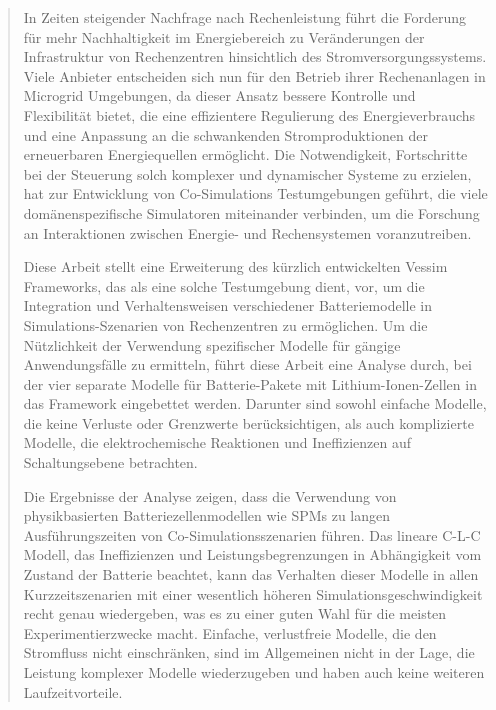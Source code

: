 \documentclass[11pt, a4paper]{report}
\begin{document}
\begin{abstract}

    In Zeiten steigender Nachfrage nach Rechenleistung führt die Forderung für mehr Nachhaltigkeit im Energiebereich zu Veränderungen der Infrastruktur von Rechenzentren hinsichtlich des Stromversorgungssystems. Viele Anbieter entscheiden sich nun für den Betrieb ihrer Rechenanlagen in Microgrid Umgebungen, da dieser Ansatz bessere Kontrolle und Flexibilität bietet, die eine effizientere Regulierung des Energieverbrauchs und eine Anpassung an die schwankenden Stromproduktionen der erneuerbaren Energiequellen ermöglicht. Die Notwendigkeit, Fortschritte bei der Steuerung solch komplexer und dynamischer Systeme zu erzielen, hat zur Entwicklung von Co-Simulations Testumgebungen geführt, die viele domänenspezifische Simulatoren miteinander verbinden, um die Forschung an Interaktionen zwischen Energie- und Rechensystemen voranzutreiben.

    Diese Arbeit stellt eine Erweiterung des kürzlich entwickelten Vessim Frameworks, das als eine solche Testumgebung dient, vor, um die Integration und Verhaltensweisen verschiedener Batteriemodelle in Simulations-Szenarien von Rechenzentren zu ermöglichen. Um die Nützlichkeit der Verwendung spezifischer Modelle für gängige Anwendungsfälle zu ermitteln, führt diese Arbeit eine Analyse durch, bei der vier separate Modelle für Batterie-Pakete mit Lithium-Ionen-Zellen in das Framework eingebettet werden. Darunter sind sowohl einfache Modelle, die keine Verluste oder Grenzwerte berücksichtigen, als auch komplizierte Modelle, die elektrochemische Reaktionen und Ineffizienzen auf Schaltungsebene betrachten.

    Die Ergebnisse der Analyse zeigen, dass die Verwendung von physikbasierten
    Batteriezellenmodellen wie SPMs zu langen Ausführungszeiten von Co-Simulationsszenarien führen. Das lineare C-L-C Modell, das Ineffizienzen und Leistungsbegrenzungen in Abhängigkeit vom Zustand der Batterie beachtet, kann das Verhalten dieser Modelle in allen Kurzzeitszenarien mit einer wesentlich höheren Simulationsgeschwindigkeit recht genau wiedergeben, was es zu einer guten Wahl für die meisten Experimentierzwecke macht. Einfache, verlustfreie Modelle, die den Stromfluss nicht einschränken, sind im Allgemeinen nicht in der Lage, die Leistung komplexer Modelle wiederzugeben und haben auch keine weiteren Laufzeitvorteile.
    
\end{abstract}
\end{document}
